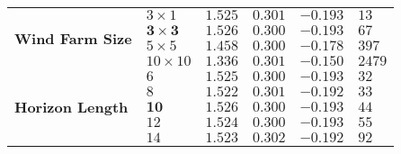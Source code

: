 \begin{tabular}{l|lllll}
\multirow{4}{*}{\textbf{Wind Farm Size}}       & $3 \times 1$           & $1.525$                         & $0.301$                         & $-0.193$                            & $13$ \\ 
&                                                        $\bm{3 \times 3}$    & $1.526$                         & $0.300$                         & $-0.193$                            & $67$ \\ 
&                                                        $5 \times 5$            & $1.458$                        & $0.300$                        & $-0.178$                           & $397$ \\ 
&                                                        $10 \times 10$          & $1.336$                       & $0.301$                       & $-0.150$                          & $2479$ \\ \hline 
\multirow{5}{*}{\textbf{Horizon Length}}       & $6$                     & $1.525$                       & $0.300$                       & $-0.193$                          & $32$ \\ 
&                                                        $8$                      & $1.522$                       & $0.301$                       & $-0.192$                          & $33$ \\ 
&                                                        $\bm{10}$             & $1.526$                      & $0.300$                      & $-0.193$                         & $44$ \\ 
&                                                        $12$                     & $1.524$                      & $0.300$                      & $-0.193$                         & $55$ \\ 
&                                                        $14$                     & $1.523$                      & $0.302$                      & $-0.192$                         & $92$ \\ \hline 
\end{tabular}